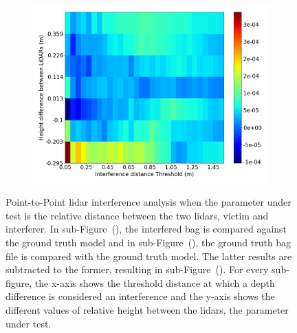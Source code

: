\begin{figure}[!ht]
\begin{subfigure}[c]{0.45\textwidth}
	\label{fig:height:ground-truth-color-mesh}
\end{subfigure}
\\ \vspace{4mm}
\begin{subfigure}[c]{0.6\textwidth}
	\includegraphics[width=\textwidth]{img/lidar-interference/height/difference_ground_truth_interference_measurement.png}
\caption{}%
	\label{fig:height:difference-color-mesh}
\end{subfigure}

\caption[Point-to-Point analysis when the relative height  between \acp{lidar} optical center is variated.]{Point-to-Point \ac{lidar} interference analysis when the parameter under test is the relative distance between the two \acp{lidar}, victim and interferer. In sub-Figure~(), the interfered bag is compared against the ground truth model and in sub-Figure~(), the ground truth bag file is compared with the ground truth model. The latter results are subtracted to the former, resulting in sub-Figure~(). For every sub-figure, the x-axis shows the threshold distance at which a depth difference is considered an interference and the y-axis shows the different values of relative height between the \acp{lidar}, the parameter under test.}
\label{fig:height:color-mesh}
\end{figure}


